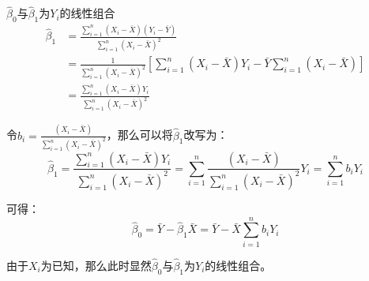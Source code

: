 \documentclass[11pt]{article}
\begin{document}
\begin{property}
    $\hat{\beta}_0$与$\hat{\beta}_1$为$Y_i$的线性组合
    \begin{align*}
        \hat{\beta}_1 &= \frac{\sum_{i=1}^{n} \left(X_i - \bar{X}\right) \left(Y_i - \bar{Y}\right)}{\sum_{i=1}^{n} \left(X_i - \bar{X}\right)^2} \\
        &= \frac{1}{\sum_{i=1}^{n} \left(X_i - \bar{X}\right)^2} \left[ \sum_{i=1}^{n} \left( X_i - \bar{X} \right) Y_i - \bar{Y} \sum_{i=1}^{n} \left( X_i - \bar{X} \right) \right] \\
        &= \frac{\sum_{i=1}^{n} \left(X_i - \bar{X}\right) Y_i}{\sum_{i=1}^{n} \left(X_i - \bar{X}\right)^2}
    \end{align*}

    令$b_i = \frac{\left(X_i - \bar{X}\right)}{\sum_{i=1}^{n} \left(X_i - \bar{X}\right)^2}$，那么可以将$\hat{\beta}_1$改写为：
    \begin{equation*}
        \hat{\beta}_1
        = \frac{\sum_{i=1}^{n} \left(X_i - \bar{X}\right) Y_i}{\sum_{i=1}^{n} \left(X_i - \bar{X}\right)^2}
        = \sum_{i=1}^{n} \frac{ \left(X_i - \bar{X}\right)}{\sum_{i=1}^{n} \left(X_i - \bar{X}\right)^2} Y_i
        = \sum_{i=1}^{n} b_i Y_i
    \end{equation*}

    可得：
    \begin{equation*}
        \hat{\beta}_0 = \bar{Y} - \hat{\beta}_1 \bar{X}
        = \bar{Y} - \bar{X} \sum_{i=1}^{n} b_i Y_i
    \end{equation*}
    
    由于$X_i$为已知，那么此时显然$\hat{\beta}_0$与$\hat{\beta}_1$为$Y_i$的线性组合。
\end{property}
\end{document}

